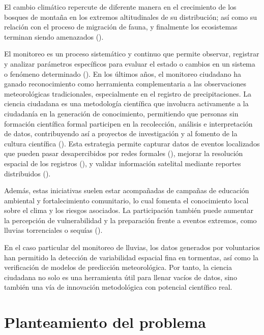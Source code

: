 El cambio climático repercute de diferente manera en el crecimiento de los bosques de montaña en los extremos altitudinales de su distribución; así como su relación con el proceso de migración de fauna, y finalmente los ecosistemas terminan siendo amenazados (\cite{hernandez2021}).





El monitoreo es un proceso sistemático y continuo que permite observar, registrar y analizar parámetros específicos para evaluar el estado o cambios en un sistema o fenómeno determinado (\cite{ciga_monitoreo}). En los últimos años, el monitoreo ciudadano ha ganado reconocimiento como herramienta complementaria a las observaciones meteorológicas tradicionales, especialmente en el registro de precipitaciones. La ciencia ciudadana es una metodología científica que involucra activamente a la ciudadanía en la generación de conocimiento, permitiendo que personas sin formación científica formal participen en la recolección, análisis e interpretación de datos, contribuyendo así a proyectos de investigación y al fomento de la cultura científica (\cite{csic_ciencia_ciudadana}). Esta estrategia permite capturar datos de eventos localizados que pueden pasar desapercibidos por redes formales  (\cite{viegas2023citizen}), mejorar la resolución espacial de los registros  (\cite{elmore2014mping}), y validar información satelital mediante reportes distribuidos  (\cite{lei2022combining}).

Además, estas iniciativas suelen estar acompañadas de campañas de educación ambiental y fortalecimiento comunitario, lo cual fomenta el conocimiento local sobre el clima y los riesgos asociados. La participación también puede aumentar la percepción de vulnerabilidad y la preparación frente a eventos extremos, como lluvias torrenciales o sequías  (\cite{okada2019community}).

En el caso particular del monitoreo de lluvias, los datos generados por voluntarios han permitido la detección de variabilidad espacial fina en tormentas, así como la verificación de modelos de predicción meteorológica. Por tanto, la ciencia ciudadana no solo es una herramienta útil para llenar vacíos de datos, sino también una vía de innovación metodológica con potencial científico real.

 
\section{Planteamiento del problema}

